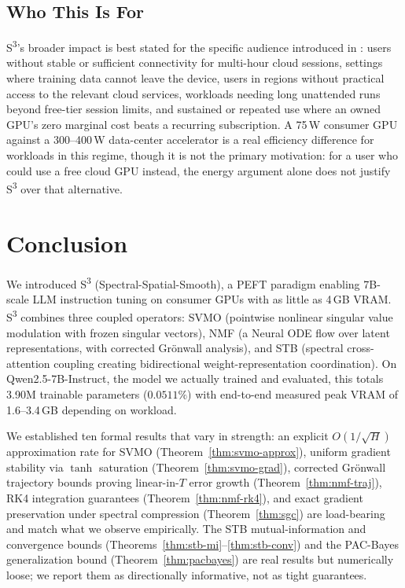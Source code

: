 \documentclass{scpe}
\newcommand{\sthree}{S\textsuperscript{3}}
\begin{document}
\subsection{Who This Is For}

\sthree{}'s broader impact is best stated for the specific audience introduced in : users without stable or sufficient connectivity for multi-hour cloud sessions, settings where training data cannot leave the device, users in regions without practical access to the relevant cloud services, workloads needing long unattended runs beyond free-tier session limits, and sustained or repeated use where an owned GPU's zero marginal cost beats a recurring subscription. A 75\,W consumer GPU against a 300--400\,W data-center accelerator is a real efficiency difference for workloads in this regime, though it is not the primary motivation: for a user who could use a free cloud GPU instead, the energy argument alone does not justify \sthree{} over that alternative.

\section{Conclusion}

We introduced S\textsuperscript{3} (Spectral-Spatial-Smooth), a PEFT paradigm enabling 7B-scale LLM instruction tuning on consumer GPUs with as little as 4\,GB VRAM. S\textsuperscript{3} combines three coupled operators: SVMO (pointwise nonlinear singular value modulation with frozen singular vectors), NMF (a Neural ODE flow over latent representations, with corrected Gr\"onwall analysis), and STB (spectral cross-attention coupling creating bidirectional weight-representation coordination). On Qwen2.5-7B-Instruct, the model we actually trained and evaluated, this totals 3.90M trainable parameters ($0.0511\%$) with end-to-end measured peak VRAM of 1.6--3.4\,GB depending on workload.

We established ten formal results that vary in strength: an explicit $O(1/\sqrt{H})$ approximation rate for SVMO (Theorem~\ref{thm:svmo-approx}), uniform gradient stability via $\tanh$ saturation (Theorem~\ref{thm:svmo-grad}), corrected Gr\"onwall trajectory bounds proving linear-in-$T$ error growth (Theorem~\ref{thm:nmf-traj}), RK4 integration guarantees (Theorem~\ref{thm:nmf-rk4}), and exact gradient preservation under spectral compression (Theorem~\ref{thm:sgc}) are load-bearing and match what we observe empirically. The STB mutual-information and convergence bounds (Theorems~\ref{thm:stb-mi}--\ref{thm:stb-conv}) and the PAC-Bayes generalization bound (Theorem~\ref{thm:pacbayes}) are real results but numerically loose; we report them as directionally informative, not as tight guarantees.
\end{document}
